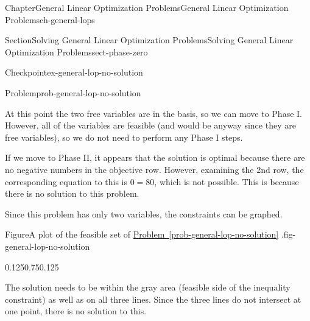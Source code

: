\documentclass[oneside,10pt,]{book}
\newcommand{\xreffont}{\relax}
\numberwithin{equation}{section}
\begin{document}
\begin{chapterptx}{Chapter}{General Linear Optimization Problems}{}{General Linear Optimization Problems}{}{}{ch-general-lops}
\begin{sectionptx}{Section}{Solving General Linear Optimization Problems}{}{Solving General Linear Optimization Problems}{}{}{sect-phase-zero}
\begin{inlineexercise}{Checkpoint}{}{ex-general-lop-no-solution}
\begin{problem}{Problem}{}{prob-general-lop-no-solution}
\begin{equation*}
\end{equation*}
%
\par
At this point the two free variables are in the basis, so we can move to Phase I. However, all of the variables are feasible (and would be anyway since they are free variables), so we do not need to perform any Phase I steps.%
\par
If we move to Phase II, it appears that the solution is optimal because there are no negative numbers in the objective row. However, examining the 2nd row, the corresponding equation to this is \(0 = 80\), which is not possible. This is because there is no solution to this problem.%
\par
Since this problem has only two variables, the constraints can be graphed.%
\begin{figureptx}{Figure}{A plot of the feasible set of \hyperref[prob-general-lop-no-solution]{Problem~{\xreffont\ref{prob-general-lop-no-solution}}} .}{fig-general-lop-no-solution}{}%
\begin{image}{0.125}{0.75}{0.125}{}%
%
\end{image}%
\tcblower
\end{figureptx}%
The solution needs to be within the gray area (feasible side of the inequality constraint) as well as on all three lines. Since the three lines do not intersect at one point, there is no solution to this.%
\end{problem}
\end{inlineexercise}%
\end{sectionptx}
%
%
\typeout{************************************************}
\typeout{************************************************}

\end{chapterptx}
\end{document}

